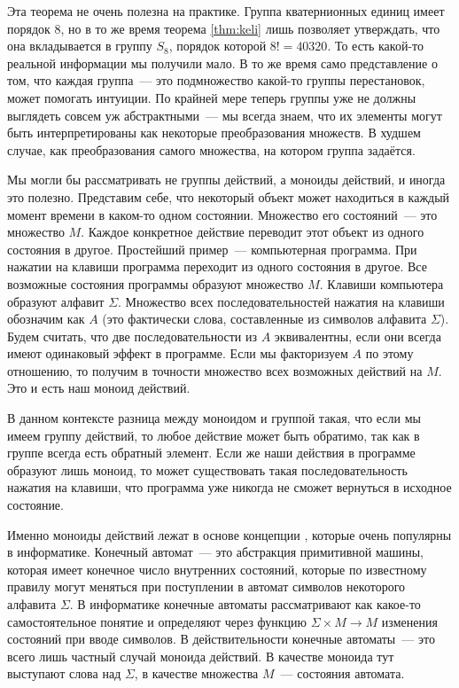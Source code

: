 Эта теорема не очень полезна на практике. Группа кватернионных единиц имеет порядок 8, но в то же время теорема \ref{thm:keli} лишь позволяет утверждать, что она вкладывается в группу $S_8$, порядок которой $8!=40320$. То есть какой-то реальной информации мы получили мало. В то же время само представление о том, что каждая группа~--- это подмножество какой-то группы перестановок, может помогать интуиции. По крайней мере теперь группы уже не должны выглядеть совсем уж абстрактными~--- мы всегда знаем, что их элементы могут быть интерпретированы как некоторые преобразования множеств. В худшем случае, как преобразования самого множества, на котором группа задаётся.

Мы могли бы рассматривать не группы действий, а моноиды действий, и иногда это полезно. Представим себе, что некоторый объект может находиться в каждый момент времени в каком-то одном состоянии. Множество его состояний~--- это множество $M$. Каждое конкретное действие переводит этот объект из одного состояния в другое. Простейший пример~--- компьютерная программа. При нажатии на клавиши программа переходит из одного состояния в другое. Все возможные состояния программы образуют множество $M$. Клавиши компьютера образуют алфавит $\Sigma$. Множество всех последовательностей нажатия на клавиши обозначим как $A$ (это фактически слова, составленные из символов алфавита $\Sigma$). Будем считать, что две последовательности из $A$ эквивалентны, если они всегда имеют одинаковый эффект в программе. Если мы факторизуем $A$ по этому отношению, то получим в точности множество всех возможных действий на $M$. Это и есть наш моноид действий.

В данном контексте разница между моноидом и группой такая, что если мы имеем группу действий, то любое действие может быть обратимо, так как в группе всегда есть обратный элемент. Если же наши действия в программе образуют лишь моноид, то может существовать такая последовательность нажатия на клавиши, что программа уже никогда не сможет вернуться в исходное состояние.

Именно моноиды действий лежат в основе концепции , которые очень популярны в информатике. Конечный автомат~--- это абстракция примитивной машины, которая имеет конечное число внутренних состояний, которые по известному правилу могут меняться при поступлении в автомат символов некоторого алфавита $\Sigma$. В информатике конечные автоматы рассматривают как какое-то самостоятельное понятие и определяют через функцию $\Sigma\times M\to M$ изменения состояний при вводе символов. В действительности конечные автоматы~--- это всего лишь частный случай моноида действий. В качестве моноида тут выступают слова над $\Sigma$, в качестве множества $M$~--- состояния автомата.

